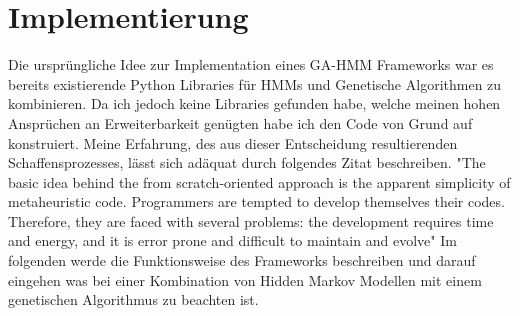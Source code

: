 \section{Implementierung}
Die ursprüngliche Idee zur Implementation eines GA-HMM Frameworks war es bereits existierende Python Libraries für HMMs und Genetische Algorithmen zu kombinieren. Da ich jedoch keine Libraries gefunden habe, welche meinen hohen Ansprüchen an Erweiterbarkeit genügten habe ich den Code von Grund auf konstruiert. Meine Erfahrung, des aus dieser Entscheidung resultierenden Schaffensprozesses, lässt sich adäquat durch folgendes Zitat beschreiben.
"The basic idea behind the from scratch-oriented approach is the apparent simplicity of metaheuristic code. Programmers are tempted to develop themselves their codes. Therefore, they are faced with several problems: the development requires time and energy, and it is error prone and difficult to maintain and evolve" \cite*{MetaheuristicsEGT}
Im folgenden werde die Funktionsweise des Frameworks beschreiben und darauf eingehen was bei einer Kombination von Hidden Markov Modellen mit einem genetischen Algorithmus zu beachten ist.

